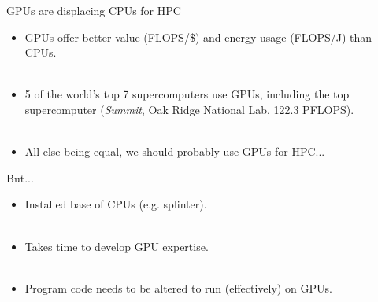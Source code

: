 \documentclass[usenames,dvipsnames]{beamer}
\begin{document}
\begin{frame}{GPUs are displacing CPUs for HPC}
  \begin{block}{}
    \begin{itemize}
      \item{GPUs offer better value (FLOPS/\$) and energy usage (FLOPS/J) than CPUs.}\\~\
      \item{5 of the world's top 7 supercomputers use GPUs, including the top supercomputer (\textit{Summit}, Oak Ridge National Lab, 122.3 PFLOPS).\footnotemark}\\~\
      \item{All else being equal, we should probably use GPUs for HPC...}
    \end{itemize}
  \end{block}
\end{frame}

\begin{frame}{But...}
  \begin{block}{}
    \begin{itemize}
      \item{Installed base of CPUs (e.g. splinter).}\\~\
      \item{Takes time to develop GPU expertise.}\\~\
      \item{Program code needs to be altered to run (effectively) on GPUs.}
    \end{itemize}
  \end{block}
\end{frame}
\end{document}
